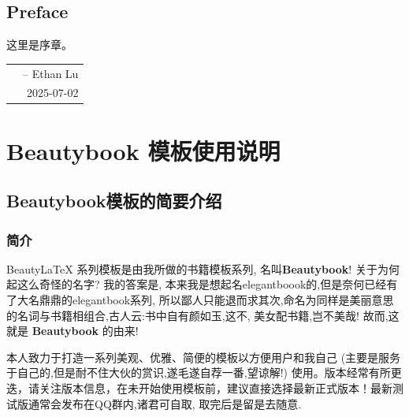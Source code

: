 \documentclass[lang=cn,zihao=-4,a4paper,fontset=none]{beautybook}
\begin{document}
\frontmatter
{}

{%
\thispagestyle{empty}
\chapter*{Preface}
这里是序章。


\hfill
\begin{tabular}{lr}
    &-- Ethan Lu\\ 
    & 2025-07-02
\end{tabular}
\clearpage}

\thispagestyle{empty}
\tableofcontents\let\cleardoublepage\clearpage


\mainmatter
{}

\part{\textbf{Beautybook} 模板使用说明}

\chapter{Beautybook模板的简要介绍}

\section{简介}

Beauty\LaTeX{} 系列模板是由我所做的书籍模板系列, 名叫\textbf{Beautybook}! 关于为何起这么奇怪的名字? 我的答案是, 本来我是想起名elegantboook的,但是奈何已经有了大名鼎鼎的elegantbook系列, 所以鄙人只能退而求其次,命名为同样是美丽意思的名词与书籍相组合,古人云:书中自有颜如玉,这不, 美女配书籍,岂不美哉! 故而,这就是 \textbf{Beautybook} 的由来!

本人致力于打造一系列美观、优雅、简便的模板以方便用户和我自己 (主要是服务于自己的,但是耐不住大伙的赏识,遂毛遂自荐一番,望谅解!) 使用。版本经常有所更迭，请关注版本信息，在未开始使用模板前，建议直接选择最新正式版本！最新测试版通常会发布在QQ群内,诸君可自取, 取完后是留是去随意.
\end{document}

